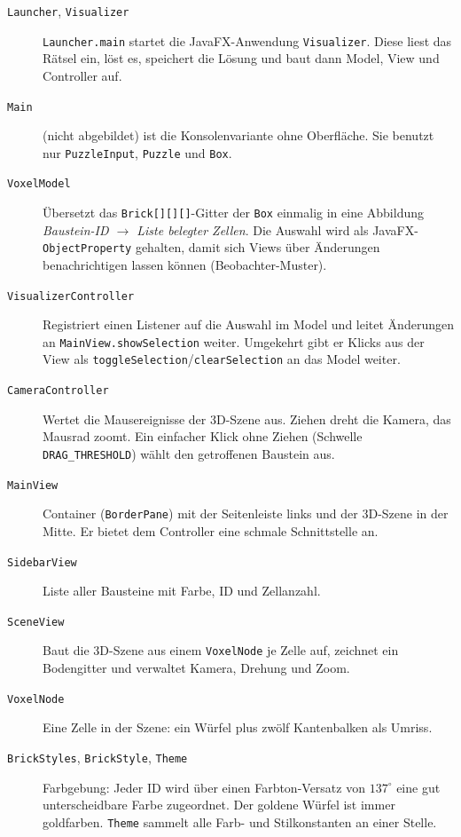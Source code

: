 \documentclass[11pt,a4paper,parskip=half]{scrartcl}
\newcommand{\code}[1]{\texttt{#1}}
\begin{document}
\begin{description}
  \item[\code{Launcher}, \code{Visualizer}] \code{Launcher.main} startet die
    JavaFX-Anwendung \code{Visualizer}. Diese liest das Rätsel ein, löst es, speichert
    die Lösung und baut dann Model, View und Controller auf.
  \item[\code{Main}] (nicht abgebildet) ist die Konsolenvariante ohne Oberfläche.
    Sie benutzt nur \code{PuzzleInput}, \code{Puzzle} und \code{Box}.
  \item[\code{VoxelModel}] Übersetzt das \code{Brick[][][]}-Gitter der \code{Box}
    einmalig in eine Abbildung \emph{Baustein-ID $\to$ Liste belegter Zellen}. Die
    Auswahl wird als JavaFX-\code{ObjectProperty} gehalten, damit sich Views über
    Änderungen benachrichtigen lassen können (Beobachter-Muster).
  \item[\code{VisualizerController}] Registriert einen Listener auf die Auswahl im
    Model und leitet Änderungen an \code{MainView.showSelection} weiter. Umgekehrt
    gibt er Klicks aus der View als \code{toggleSelection}/\code{clearSelection} an
    das Model weiter.
  \item[\code{CameraController}] Wertet die Mausereignisse der 3D-Szene aus. Ziehen
    dreht die Kamera, das Mausrad zoomt. Ein einfacher Klick ohne Ziehen (Schwelle
    \code{DRAG\_THRESHOLD}) wählt den getroffenen Baustein aus.
  \item[\code{MainView}] Container (\code{BorderPane}) mit der Seitenleiste links und
    der 3D-Szene in der Mitte. Er bietet dem Controller eine schmale Schnittstelle an.
  \item[\code{SidebarView}] Liste aller Bausteine mit Farbe, ID und Zellanzahl.
  \item[\code{SceneView}] Baut die 3D-Szene aus einem \code{VoxelNode} je Zelle auf,
    zeichnet ein Bodengitter und verwaltet Kamera, Drehung und Zoom.
  \item[\code{VoxelNode}] Eine Zelle in der Szene: ein Würfel plus zwölf
    Kantenbalken als Umriss.
  \item[\code{BrickStyles}, \code{BrickStyle}, \code{Theme}] Farbgebung: Jeder ID
    wird über einen Farbton-Versatz von $137^\circ$ eine gut unterscheidbare Farbe
    zugeordnet. Der goldene Würfel ist immer goldfarben. \code{Theme} sammelt alle
    Farb- und Stilkonstanten an einer Stelle.
\end{description}

\end{document}
